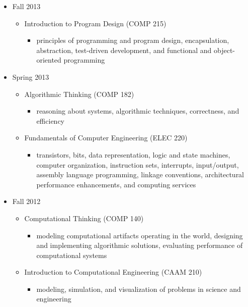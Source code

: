 \documentclass[a4paper]{article}
\begin{document}
\begin{itemize}
\begin{itemize}
    \end{itemize}

    \item{Fall 2013}
    \begin{itemize}

        \item{Introduction to Program Design (COMP 215)}
        \begin{itemize}
            \item{principles of programming and program design, encapsulation, abstraction, test-driven development, and functional and object-oriented programming}
        \end{itemize}

    \end{itemize}

    \item{Spring 2013}
    \begin{itemize}

        \item{Algorithmic Thinking (COMP 182)}
        \begin{itemize}
            \item{reasoning about systems, algorithmic techniques, correctness, and efficiency}
        \end{itemize}

        \item{Fundamentals of Computer Engineering (ELEC 220)}
        \begin{itemize}
            \item{transistors, bits, data representation, logic and state machines, computer organization, instruction sets, interrupts, input/output, assembly language programming, linkage conventions, architectural performance enhancements, and computing services}
        \end{itemize}

    \end{itemize}

    \item{Fall 2012}
    \begin{itemize}

        \item{Computational Thinking (COMP 140)}
        \begin{itemize}
            \item{modeling computational artifacts operating in the world, designing and implementing algorithmic solutions, evaluating performance of computational systems}
        \end{itemize}

        \item{Introduction to Computational Engineering (CAAM 210)}
        \begin{itemize}
            \item{modeling, simulation, and visualization of problems in science and engineering}
        \end{itemize}

    \end{itemize}

\end{itemize}
\end{document}
